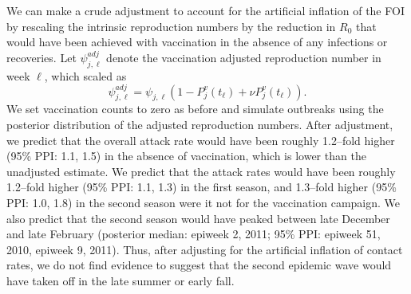 We can make a crude adjustment to account for the artificial inflation of the FOI by rescaling the intrinsic reproduction numbers by the reduction in $ R_0 $ that would have been achieved with vaccination in the absence of any infections or recoveries. Let $ \psi_{j,\ell}^{adj} $ denote the vaccination adjusted reproduction number in week $ \ell $, which scaled as
\begin{equation}
\label{eqn:R0_adj}
\psi_{j,\ell}^{adj} = \psi_{j,\ell}\left (1 - P^v_j(t_\ell) + \nu P^v_j(t_\ell)\right ).\end{equation}
We set vaccination counts to zero as before and simulate outbreaks using the posterior distribution of the adjusted reproduction numbers. After adjustment, we predict that the overall attack rate would have been roughly 1.2--fold higher (95\% PPI: 1.1, 1.5) in the absence of vaccination, which is lower than the unadjusted estimate. We predict that the attack rates would have been roughly 1.2--fold higher (95\% PPI: 1.1, 1.3) in the first season, and 1.3--fold higher (95\% PPI: 1.0, 1.8) in the second season were it not for the vaccination campaign. We also predict that the second season would have peaked between late December and late February (posterior median: epiweek 2, 2011; 95\% PPI: epiweek 51, 2010, epiweek 9, 2011). Thus, after adjusting for the artificial inflation of contact rates, we do not find evidence to suggest that the second epidemic wave would have taken off in the late summer or early fall. 
 
